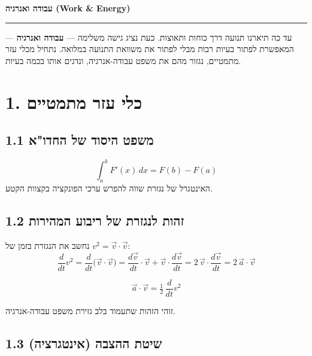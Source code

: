 \documentclass[12pt, a4paper]{article}
\newcommand{\hvec}[1]{\overrightarrow{#1}}
\begin{document}

\begin{center}
  {\LARGE\bfseries עבודה ואנרגיה \textenglish{(Work \& Energy)}}\\[6pt]
  \rule{\linewidth}{0.8pt}
\end{center}
\vspace{0.5cm}

עד כה תיארנו תנועה דרך כוחות ותאוצות. כעת נציג גישה משלימה --- \textbf{עבודה ואנרגיה} --- המאפשרת לפתור בעיות רבות מבלי לפתור את משוואת התנועה במלואה. נתחיל מכלי עזר מתמטיים, נגזור מהם את משפט עבודה-אנרגיה, ונדגים אותו בכמה בעיות.

\section*{1. כלי עזר מתמטיים}

\subsection*{1.1 משפט היסוד של החדו"א}

\begin{tcolorbox}[defbox, title={משפט היסוד של החשבון הדיפרנציאלי והאינטגרלי}]
\[
  \int_a^b F'(x)\,dx = F(b) - F(a)
\]
האינטגרל של נגזרת שווה להפרש ערכי הפונקציה בקצוות הקטע.
\end{tcolorbox}

\subsection*{1.2 זהות לנגזרת של ריבוע המהירות}

נחשב את הנגזרת בזמן של \textenglish{$v^2 = \hvec{v}\cdot\hvec{v}$}:
\[
  \frac{d}{dt}v^2 = \frac{d}{dt}\bigl(\hvec{v}\cdot\hvec{v}\bigr)
  = \frac{d\hvec{v}}{dt}\cdot\hvec{v} + \hvec{v}\cdot\frac{d\hvec{v}}{dt}
  = 2\,\hvec{v}\cdot\frac{d\hvec{v}}{dt}
  = 2\,\hvec{a}\cdot\hvec{v}
\]

\begin{tcolorbox}[resultbox]
\[
  \hvec{a}\cdot\hvec{v} = \tfrac{1}{2}\,\frac{d}{dt}v^2
\]
\end{tcolorbox}

זוהי הזהות שתעמוד בלב גזירת משפט עבודה-אנרגיה.

\subsection*{1.3 שיטת ההצבה (אינטגרציה)}
\end{document}
